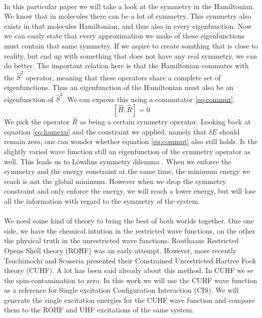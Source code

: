 \documentclass[twoside,twocolumn,9pt]{article}
\begin{document}
\paragraph*{}
In this particular paper we will take a look at the symmetry in the Hamiltonian. We know that in molecules there can be a lot of symmetry. This symmetry also exists in that 
molecules Hamiltonian, and thus also in every eigenfunction. Now we can easily state that every approximation we make of these eigenfunctions must contain that same symmetry. 
If we aspire to create somthing that is close to reality, but end up with something that does not have any real symmetry, we can do better. The important relation here is that 
the Hamiltonian commutes with the $\hat{S}^2$ operator, meaning that these operators share a complete set of eigenfunctions. Thus an eigenfunction of the Hamiltonian must also
be an eigenfunction of $\hat{S}^2$. We can express this using a commutator \eqref{eq:commut}.
\begin{equation}\label{eq:commut}
  [\hat{H}, \hat{R}] = 0
\end{equation}
We pick the operator $\hat{R}$ as being a certain symmetry operator. Looking back at equation \eqref{eq:hamexp} and the constraint we applied, namely that $\delta E$ should 
remain zero, one can wonder whether equation \eqref{eq:commut} also still holds. Is the slightly varied wave function still an eigenfunction of the symmetry operator as well.
This leads us to Löwdins symmetry dilemma \cite{Lowdin1963}. When we enforce the symmetry and the energy constraint at the same time, the minimum energy we reach is not the
global minimum. However when we drop the symmetry constraint and only enforce the energy, we will reach a lower energy, but will lose all the information with regard to the
symmetry of the system.

\paragraph*{}
We need some kind of theory to bring the best of both worlds together. One one side, we have the chemical intution in the restricted wave functions, on the other the physical
truth in the unrestricted wave functions. Roothaans Restricted Opens Shell theory (ROHF)\cite{Roothaan1960} was an early attempt. However, more recently Tsuchimochi and Scuseria
presented their Constrained Unrestricted Hartree Fock theory (CUHF)\cite{Scuseria2010}. A lot has been said already about this method\cite{Plakhutin2014, Scuseria2011}. In CUHF we
se the spin-contamination to zero. In this work we will use the CUHF wave function as a reference for Single excitation Configuration Interaction (CIS). We will generate the single
excitation energies for the CUHF wave function and compare them to the ROHF and UHF excitations of the same system. 
\end{document}

